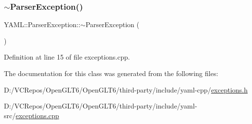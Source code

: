 \mbox{\label{class_y_a_m_l_1_1_parser_exception_a67e0c3483cb340fe09d6b0779ab6613d}} 
\subsubsection{\texorpdfstring{$\sim$ParserException()}{~ParserException()}}
{\footnotesize\ttfamily Y\+A\+M\+L\+::\+Parser\+Exception\+::$\sim$\+Parser\+Exception (\begin{DoxyParamCaption}{ }\end{DoxyParamCaption})\hspace{0.3cm}{\ttfamily [virtual]}}



Definition at line 15 of file exceptions.\+cpp.



The documentation for this class was generated from the following files\+:\begin{DoxyCompactItemize}
\item 
D\+:/\+V\+C\+Repos/\+Open\+G\+L\+T6/\+Open\+G\+L\+T6/third-\/party/include/yaml-\/cpp/\mbox{\hyperlink{exceptions_8h}{exceptions.\+h}}\item 
D\+:/\+V\+C\+Repos/\+Open\+G\+L\+T6/\+Open\+G\+L\+T6/third-\/party/include/yaml-\/src/\mbox{\hyperlink{exceptions_8cpp}{exceptions.\+cpp}}\end{DoxyCompactItemize}
